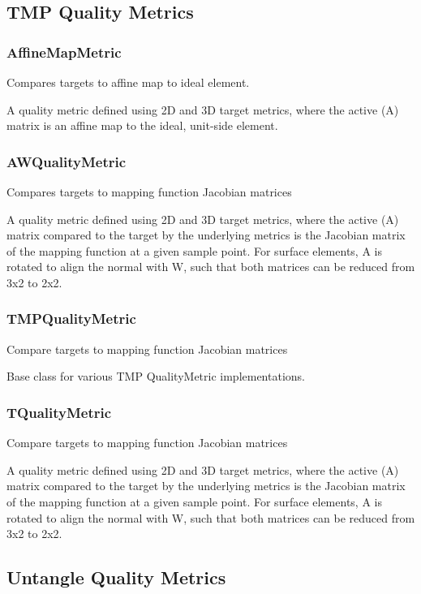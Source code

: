 \subsection{TMP Quality Metrics}

\subsubsection{AffineMapMetric}

Compares targets to affine map to ideal element.

A quality metric defined using 2D and 3D target metrics, where the active (A) matrix is an affine map to the ideal, unit-side element.

\subsubsection{AWQualityMetric}

Compares targets to mapping function Jacobian matrices

 A quality metric defined using 2D and 3D target metrics, where the active (A) matrix compared to the target by the underlying metrics is the Jacobian matrix of the mapping function at a given sample point.  For surface elements, A is rotated to align the normal with W, such that both matrices can be reduced from 3x2 to 2x2.

\subsubsection{TMPQualityMetric}

Compare targets to mapping function Jacobian matrices

 Base class for various TMP QualityMetric implementations.

\subsubsection{TQualityMetric}

Compare targets to mapping function Jacobian matrices

A quality metric defined using 2D and 3D target metrics, where the active (A) matrix compared to the target by the underlying metrics is the Jacobian matrix of the mapping function at a given sample point.  For surface elements, A is rotated to align the normal with W, such that both matrices can be reduced from 3x2 to 2x2.

\subsection{Untangle Quality Metrics}

